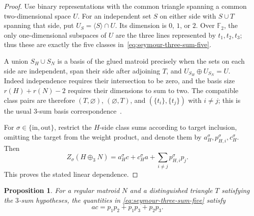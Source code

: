 \documentclass[11pt]{article}
\numberwithin{equation}{section}
\newtheorem{proposition}[definition]{Proposition}
\theoremstyle{remark}
\begin{document}
\begin{proof}
Use binary representations with the common triangle spanning a common
two-dimensional space $U$. For an independent set $S$ on either side with
$S\cup T$ spanning that side, put $U_S=\langle S\rangle\cap U$. Its dimension
is $0$, $1$, or $2$. Over $\mathbb F_2$, the only one-dimensional subspaces
of $U$ are the three lines represented by $t_1,t_2,t_3$; thus these are exactly
the five classes in~\eqref{eq:seymour-three-sum-five}.

A union $S_H\cup S_N$ is a basis of the glued matroid precisely when the
sets on each side are independent, span their side after adjoining $T$, and
$U_{S_H}\oplus U_{S_N}=U$. Indeed independence requires their intersection
to be zero, and the basis size $r(H)+r(N)-2$ requires their dimensions to
sum to two. The compatible class pairs are therefore $(T,\varnothing)$,
$(\varnothing,T)$, and $(\{t_i\},\{t_j\})$ with $i\ne j$; this is the
usual $3$-sum basis correspondence~\cite[Sec.~2]{BercziMatravolgyiSchwarcz2023}.

For $\sigma\in\{\mathrm{in},\mathrm{out}\}$, restrict the $H$-side class
sums according to target inclusion, omitting the target from the weight
product, and denote them by $a_H^\sigma,p_{H,i}^\sigma,c_H^\sigma$. Then
\[
 Z_\sigma(H\oplus_3N)
 =a_H^\sigma c+c_H^\sigma a+\sum_{i\ne j}p_{H,i}^\sigma p_j.
\]
This proves the stated linear dependence.
\end{proof}

\begin{proposition}
\label{prop:regular-triangle-identity}
For a regular matroid $N$ and a distinguished triangle $T$ satisfying the
$3$-sum hypotheses, the quantities in
\eqref{eq:seymour-three-sum-five} satisfy
\begin{equation}
    ac=p_1p_2+p_1p_3+p_2p_3.
    \label{eq:regular-triangle-identity}
\end{equation}
\end{proposition}
\end{document}
